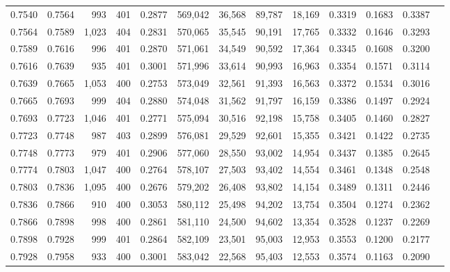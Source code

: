\begin{tabular}{rrrrrrrrrrrrr}
0.7540 & 0.7564 &   993 & 401 &                                     0.2877 & 569,042 &  36,568 &  89,787 &  18,169 & 0.3319 & 0.1683 & 0.3387 \\
0.7564 & 0.7589 & 1,023 & 404 &                                     0.2831 & 570,065 &  35,545 &  90,191 &  17,765 & 0.3332 & 0.1646 & 0.3293 \\
0.7589 & 0.7616 &   996 & 401 &                                     0.2870 & 571,061 &  34,549 &  90,592 &  17,364 & 0.3345 & 0.1608 & 0.3200 \\
0.7616 & 0.7639 &   935 & 401 &                                     0.3001 & 571,996 &  33,614 &  90,993 &  16,963 & 0.3354 & 0.1571 & 0.3114 \\
0.7639 & 0.7665 & 1,053 & 400 &                                     0.2753 & 573,049 &  32,561 &  91,393 &  16,563 & 0.3372 & 0.1534 & 0.3016 \\
0.7665 & 0.7693 &   999 & 404 &                                     0.2880 & 574,048 &  31,562 &  91,797 &  16,159 & 0.3386 & 0.1497 & 0.2924 \\
0.7693 & 0.7723 & 1,046 & 401 &                                     0.2771 & 575,094 &  30,516 &  92,198 &  15,758 & 0.3405 & 0.1460 & 0.2827 \\
0.7723 & 0.7748 &   987 & 403 &                                     0.2899 & 576,081 &  29,529 &  92,601 &  15,355 & 0.3421 & 0.1422 & 0.2735 \\
0.7748 & 0.7773 &   979 & 401 &                                     0.2906 & 577,060 &  28,550 &  93,002 &  14,954 & 0.3437 & 0.1385 & 0.2645 \\
0.7774 & 0.7803 & 1,047 & 400 &                                     0.2764 & 578,107 &  27,503 &  93,402 &  14,554 & 0.3461 & 0.1348 & 0.2548 \\
0.7803 & 0.7836 & 1,095 & 400 &                                     0.2676 & 579,202 &  26,408 &  93,802 &  14,154 & 0.3489 & 0.1311 & 0.2446 \\
0.7836 & 0.7866 &   910 & 400 &                                     0.3053 & 580,112 &  25,498 &  94,202 &  13,754 & 0.3504 & 0.1274 & 0.2362 \\
0.7866 & 0.7898 &   998 & 400 &                                     0.2861 & 581,110 &  24,500 &  94,602 &  13,354 & 0.3528 & 0.1237 & 0.2269 \\
0.7898 & 0.7928 &   999 & 401 &                                     0.2864 & 582,109 &  23,501 &  95,003 &  12,953 & 0.3553 & 0.1200 & 0.2177 \\
0.7928 & 0.7958 &   933 & 400 &                                     0.3001 & 583,042 &  22,568 &  95,403 &  12,553 & 0.3574 & 0.1163 & 0.2090 \\

\end{tabular}
